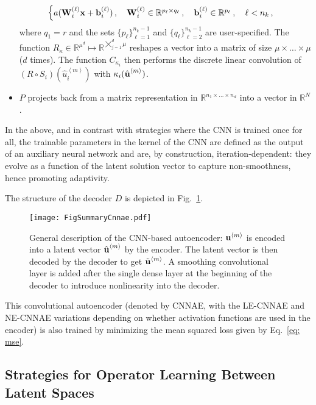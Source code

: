\begin{itemize}
\begin{align}
\begin{cases}
        a(\textbf{W}^{(\ell)}_i \textbf{x} + \textbf{b}^{(\ell)}_i)\,, \quad \textbf{W}^{(\ell)}_i \in \mathbb{R}^{p_\ell \times q_\ell} \,, \quad \textbf{b}^{(\ell)}_i \in \mathbb{R}^{p_\ell}\,, \quad \ell < n_k\,,
    \end{cases}
    \end{align}
    where $q_1 = r$ and the sets $\{p_\ell\}_{\ell = 1}^{n_k - 1}$ and $\{q_\ell\}_{\ell = 2}^{n_k - 1}$ are user-specified. The function $R_\kappa \in \mathbb{R}^{\mu^d} \mapsto \mathbb{R}^{\bigtimes_{j = 1}^d \mu}$ reshapes a vector into a matrix of size $\mu \times \ldots \times \mu $ ($d$ times). The function $C_{\kappa_i}$ then performs the discrete linear convolution of $(R \circ S_i)(\hat{u}_i^{\left<m\right>})$ with $\kappa_i(\hat{\textbf{u}}^{\left<m\right>})$.
    \item $P$ projects back from a matrix representation in $\mathbb{R}^{n_1 \times \ldots \times n_d}$ into a vector in $\mathbb{R}^N$.
\end{itemize}
In the above, and in contrast with strategies where the CNN is trained once for all, the trainable parameters in the kernel of the CNN are defined as the output of an auxiliary neural network and are, by construction, iteration-dependent: they evolve as a function of the latent solution vector to capture non-smoothness, hence promoting adaptivity.

The structure of the decoder $D$ is depicted in Fig.~\ref{fig: summary of cnnae}. 
\begin{figure}[!htb]
    \begin{center}
        \texttt{[image: FigSummaryCnnae.pdf]}
    \end{center}
    \caption[General description of the CNN-based autoencoder.]{General description of the CNN-based autoencoder: $\textbf{u}^{\left<m\right>}$ is encoded into a latent vector $\hat{\textbf{u}}^{\left<m\right>}$ by the encoder. The latent vector is then decoded by the decoder to get $\tilde{\textbf{u}}^{\left<m\right>}$. A smoothing convolutional layer is added after the single dense layer at the beginning of the decoder to introduce nonlinearity into the decoder.}
    \label{fig: summary of cnnae}
\end{figure}
This convolutional autoencoder (denoted by CNNAE, with the LE-CNNAE and NE-CNNAE variations depending on whether activation functions are used in the encoder) is also trained by minimizing the mean squared loss given by Eq.~\eqref{eq: mse}.

\subsection{Strategies for Operator Learning Between Latent Spaces}\label{sec: operators}

